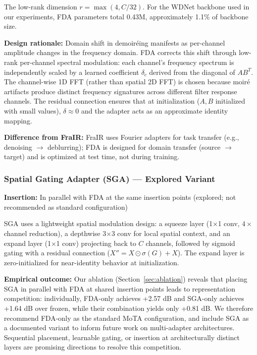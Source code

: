 \documentclass[review,10pt]{elsarticle}
\begin{document}
The low-rank dimension $r = \max(4, C/32)$. For the WDNet backbone used in our experiments, FDA parameters total 0.43M, approximately 1.1\% of backbone size.

\textbf{Design rationale:} Domain shift in demoir\'{e}ing manifests as per-channel amplitude changes in the frequency domain. FDA corrects this shift through low-rank per-channel spectral modulation: each channel's frequency spectrum is independently scaled by a learned coefficient $\delta_c$ derived from the diagonal of $A B^T$. The channel-wise 1D FFT (rather than spatial 2D FFT) is chosen because moir\'{e} artifacts produce distinct frequency signatures across different filter response channels. The residual connection ensures that at initialization ($A, B$ initialized with small values), $\delta \approx 0$ and the adapter acts as an approximate identity mapping.

\textbf{Difference from FraIR:} FraIR \cite{korkmaz2026frair} uses Fourier adapters for task transfer (e.g., denoising $\to$ deblurring); FDA is designed for domain transfer (source $\to$ target) and is optimized at test time, not during training.

\subsubsection{Spatial Gating Adapter (SGA) --- Explored Variant}

\textbf{Insertion:} In parallel with FDA at the same insertion points (explored; not recommended as standard configuration)

SGA uses a lightweight spatial modulation design: a squeeze layer (1$\times$1 conv, $4\times$ channel reduction), a depthwise 3$\times$3 conv for local spatial context, and an expand layer (1$\times$1 conv) projecting back to $C$ channels, followed by sigmoid gating with a residual connection ($X'' = X \odot \sigma(G) + X$). The expand layer is zero-initialized for near-identity behavior at initialization.

\textbf{Empirical outcome:} Our ablation (Section~\ref{sec:ablation}) reveals that placing SGA in parallel with FDA at shared insertion points leads to representation competition: individually, FDA-only achieves +2.57 dB and SGA-only achieves +1.64 dB over frozen, while their combination yields only +0.81 dB. We therefore recommend FDA-only as the standard MoTA configuration, and include SGA as a documented variant to inform future work on multi-adapter architectures. Sequential placement, learnable gating, or insertion at architecturally distinct layers are promising directions to resolve this competition.
\end{document}
